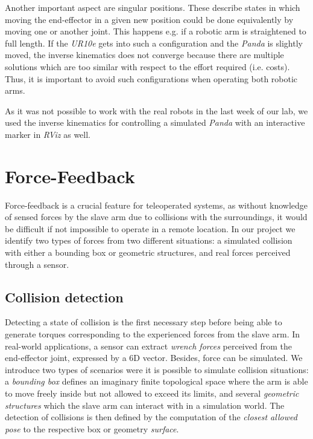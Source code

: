\documentclass[runningheads]{llncs}
\begin{document}

Another important aspect are singular positions. These describe states in which moving the end-effector in a given new position could be done equivalently by moving one or another joint. This happens e.g. if a robotic arm is straightened to full length. If the \textit{UR10e} gets into such a configuration and the \textit{Panda} is slightly moved, the inverse kinematics does not converge because there are multiple solutions which are too similar with respect to the effort required (i.e. costs). Thus, it is important to avoid such configurations when operating both robotic arms.


As it was not possible to work with the real robots in the last week of our lab, we used the inverse kinematics for controlling a simulated \textit{Panda} with an interactive marker in \textit{RViz} as well.

\section{Force-Feedback}
\label{section:ff}

Force-feedback is a crucial feature for teleoperated systems, as without knowledge of sensed forces by the slave arm due to collisions with the surroundings, it would be difficult if not impossible to operate in a remote location. In our project we identify two types of forces from two different situations: a simulated collision with either a bounding box or geometric structures, and real forces perceived through a sensor.


\subsection{Collision detection}

Detecting a state of collision is the first necessary step before being able to generate torques corresponding to the experienced forces from the slave arm. In real-world applications, a sensor can extract \textit{wrench forces} perceived from the end-effector joint, expressed by a 6D vector. Besides, force can be simulated. We introduce two types of scenarios were it is possible to simulate collision situations: a \textit{bounding box} defines an imaginary finite topological space where the arm is able to move freely inside but not allowed to exceed its limits, and several \textit{geometric structures} which the slave arm can interact with in a simulation world. The detection of collisions is then defined by the computation of the \textit{closest allowed pose} to the respective box or geometry \textit{surface}.
\end{document}

